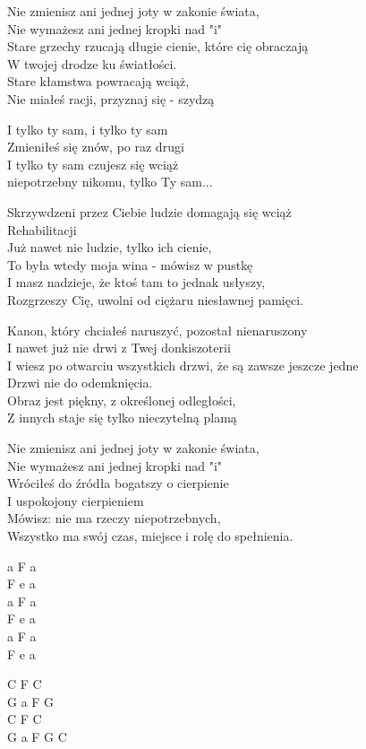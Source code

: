 \begin{text}
    Nie zmienisz ani jednej joty w zakonie świata,\\
    Nie wymażesz ani jednej kropki nad "i"\\
    Stare grzechy rzucają długie cienie, które cię obraczają\\
    W twojej drodze ku światłości.\\
    Stare kłamstwa powracają wciąż,\\
    Nie miałeś racji, przyznaj się - szydzą

    \vin I tylko ty sam, i tylko ty sam\\
    \vin Zmieniłeś się znów, po raz drugi\\
    \vin I tylko ty sam czujesz się wciąż\\
    \vin niepotrzebny nikomu, tylko Ty sam...

    Skrzywdzeni przez Ciebie ludzie domagają się wciąż\\
    Rehabilitacji\\
    Już nawet nie ludzie, tylko ich cienie,\\
    To była wtedy moja wina - mówisz w pustkę\\
    I masz nadzieje, że ktoś tam to jednak usłyszy,\\
    Rozgrzeszy Cię, uwolni od ciężaru niesławnej pamięci.

    Kanon, który chciałeś naruszyć, pozostał nienaruszony\\
    I nawet już nie drwi z Twej donkiszoterii\\
    I wiesz po otwarciu wszystkich drzwi, że są zawsze jeszcze jedne\\
    Drzwi nie do odemknięcia.\\
    Obraz jest piękny, z określonej odległości,\\
    Z innych staje się tylko nieczytelną plamą

    Nie zmienisz ani jednej joty w zakonie świata,\\
    Nie wymażesz ani jednej kropki nad "i"\\
    Wróciłeś do źródła bogatszy o cierpienie\\
    I uspokojony cierpieniem\\
    Mówisz: nie ma rzeczy niepotrzebnych,\\
    Wszystko ma swój czas, miejsce i rolę do spełnienia.
\end{text}
\begin{chord}
    a F a\\
    F e a\\
    a F a\\
    F e a\\
    a F a\\
    F e a

    C F C\\
    G a F G\\
    C F C\\
    G a F G C
\end{chord}